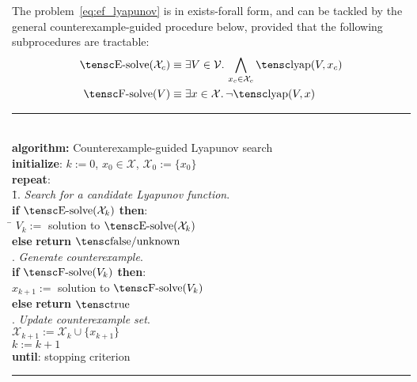 \documentclass[10pt]{article}
\theoremstyle{remark}
\theoremstyle{definition}
\theoremstyle{plain}
\begin{document}
The problem~\eqref{eq:ef_lyapunov} is in exists-forall form, and can be tackled
by the general counterexample-guided procedure below, provided that the
following subprocedures are tractable:
\begin{align*}
	\mathsc{E-solve}(\mathcal{X}_c)
	&\equiv \exists V \in \mathcal{V} .\, \bigwedge_{x_c \in \mathcal{X}_c}
		\mathsc{lyap}(V,x_c)\\
	\mathsc{F-solve}(V)
	&\equiv \exists x \in \mathcal{X} .\, \neg \mathsc{lyap}(V,x)\\
\end{align*}
\begin{tabbing}
    \rule{\linewidth}{0.4pt}\\
    \textbf{algorithm:} Counterexample-guided Lyapunov search\\
    \textbf{initialize}: $k:=0$, $x_0 \in \mathcal{X}$, $\mathcal{X}_0:=\{x_0\}$\\
    \textbf{repeat}: \\
        \quad
        \= 1. \= \emph{Search for a candidate Lyapunov function}.\\
		\>\>\quad\=\textbf{if} $\mathsc{E-solve}(\mathcal{X}_k)$ \textbf{then}: \\
		\>\>\>\quad\= $V_k:=$ solution to $\mathsc{E-solve}(\mathcal{X}_k)$\\
		\>\>\>\textbf{else} \textbf{return} $\mathsc{false/unknown}$\\
		. \> \emph{Generate counterexample}. \\
		\>\>\>\textbf{if} $\mathsc{F-solve}(V_k)$ \textbf{then}: \\
		\>\>\>\> $x_{k+1}:=$ solution to $\mathsc{F-solve}(V_k)$\\
		\>\>\>\textbf{else} \textbf{return} $\mathsc{true}$\\
		. \> \emph{Update counterexample set}.\\
		\>\>\>$\mathcal{X}_{k+1}:= \mathcal{X}_k \cup \{x_{k+1}\}$\\
		\>\>\>$k:=k+1$\\
    \textbf{until}: stopping criterion\\
    \rule{\linewidth}{0.4pt}
\end{tabbing}
\end{document}
